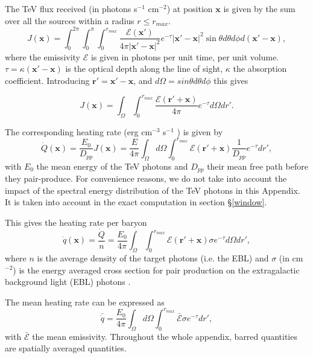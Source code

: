 \documentclass[twocolumns]{emulateapj}
\begin{document}
The TeV flux received (in photons s$^{-1}$ cm$^{-2}$) at position $\mathbf{x}$ is given by the sum over all the sources within a radius $r\leqslant r_{max}$.
\begin{equation}
  \label{eq:flux_recu0}
  J(\mathbf{x})=\int_{0}^{2\pi}\int_{0}^{\pi}\int_0^{r_{max}}   \frac{\mathcal{E}(\mathbf{x}') }{4\pi |\mathbf{x}'-\mathbf{x}|^2} e^{-\tau} |\mathbf{x}'-\mathbf{x}|^2 \sin\theta d\theta d\phi d(\mathbf{x}'-\mathbf{x}),
\end{equation}
where the emissivity $\mathcal{E}$ is given in photons per unit time, per unit volume. $\tau=\kappa (\mathbf{x}'-\mathbf{x})$ is the optical depth along the line of sight, $\kappa$ the absorption coefficient.
Introducing $\mathbf{r'}=\mathbf{x}'-\mathbf{x}$, and $d\Omega=sin\theta d\theta d\phi$ this gives


\begin{equation}
  \label{eq:flux_recu}
  J(\mathbf{x})=\int_{\Omega}\int_0^{r_{max}}   \frac{\mathcal{E}(\mathbf{r}'+\mathbf{x}) }{4\pi } e^{-\tau} d\Omega dr'.
\end{equation}

The corresponding heating rate (erg cm$^{-3}$ s$^{-1}$ ) is given by 
\begin{equation}
  \label{eq:heating_rate0}
  \dot{Q}(\mathbf{x})=\frac{E_0}{D_{pp}}J(\mathbf{x}) =\frac{E}{4\pi}   \int_{\Omega}d\Omega\int_0^{r_{max}}   \mathcal{E}(\mathbf{r}'+\mathbf{x}) \frac{1}{D_{pp}}  e^{-\tau} dr' ,
\end{equation}
with $E_0$ the mean energy of the TeV photons and $D_{pp}$ their mean free path  before they pair-produce. For convenience reasons,  we  do not take into account the impact of the spectral energy distribution of the TeV photons in this Appendix. It is taken into account in the exact computation in section \S\ref{window}.

This gives the  heating rate per baryon
\begin{equation}
  \label{eq:heating_rate0}
  \dot{q}(\mathbf{x})=\frac{\dot{Q}}{n}= \frac{E_0}{4\pi}  \int_{\Omega}\int_0^{r_{max}}   \mathcal{E}(\mathbf{r}'+\mathbf{x})\sigma  e^{-\tau}d\Omega dr' ,
\end{equation}
where $n$ is the average density of the target photons (i.e. the EBL) and $\sigma$ (in cm$^{-2}$) is the energy averaged cross section for pair production on the extragalactic background light (EBL) photons \citep{1967PhRv..155.1408G}. 


The mean heating rate can be expressed as
\begin{equation}
  \label{eq:heating_rate0}
  \bar{\dot{q}}=\frac{E_0}{4\pi} \int_{\Omega}d\Omega\int_0^{r_{max}}  \bar{\mathcal{E}}\sigma  e^{-\tau}dr', 
\end{equation}
with $\bar{\mathcal{E}}$ the mean emissivity. Throughout the whole appendix, barred quantities are spatially averaged quantities.
\end{document}
